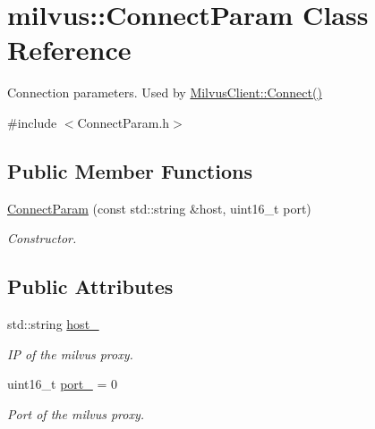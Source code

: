 \hypertarget{classmilvus_1_1_connect_param}{}\section{milvus\+:\+:Connect\+Param Class Reference}
\label{classmilvus_1_1_connect_param}


Connection parameters. Used by \hyperlink{classmilvus_1_1_milvus_client_a617f8dbeb20e2bd3da0736f38927d2bb}{Milvus\+Client\+::\+Connect()}  




{\ttfamily \#include $<$Connect\+Param.\+h$>$}

\subsection*{Public Member Functions}
\begin{DoxyCompactItemize}
\item 
\mbox{\label{classmilvus_1_1_connect_param_a32d3321e97873a2679f9ce4f965568df}} 
\hyperlink{classmilvus_1_1_connect_param_a32d3321e97873a2679f9ce4f965568df}{Connect\+Param} (const std\+::string \&host, uint16\+\_\+t port)
\begin{DoxyCompactList}\small\item\em Constructor. \end{DoxyCompactList}\end{DoxyCompactItemize}
\subsection*{Public Attributes}
\begin{DoxyCompactItemize}
\item 
\mbox{\label{classmilvus_1_1_connect_param_a51a0d3880ada5b57c1cfac9de5673204}} 
std\+::string \hyperlink{classmilvus_1_1_connect_param_a51a0d3880ada5b57c1cfac9de5673204}{host\+\_\+}
\begin{DoxyCompactList}\small\item\em IP of the milvus proxy. \end{DoxyCompactList}\item 
\mbox{\label{classmilvus_1_1_connect_param_ad46a8811bace981c1443766a81d55fc0}} 
uint16\+\_\+t \hyperlink{classmilvus_1_1_connect_param_ad46a8811bace981c1443766a81d55fc0}{port\+\_\+} = 0
\begin{DoxyCompactList}\small\item\em Port of the milvus proxy. \end{DoxyCompactList}\end{DoxyCompactItemize}


